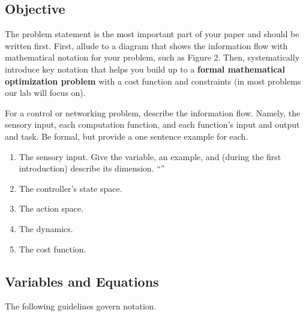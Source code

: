 \subsection{Objective}
The problem statement is the most important part of your paper and should be written first. First, allude to a diagram that shows the information flow with mathematical notation for your problem, such as Figure 2.
Then, systematically introduce key notation that helps you build up to a \textbf{formal mathematical optimization problem} with a cost function and constraints (in most problems our lab will focus on).

For a control or networking problem, describe the information flow. 
Namely, the sensory input, each computation function, and each function's input and output and task. Be formal, but provide a one sentence example for each.

\begin{enumerate}
    \item The sensory input.  Give the variable, an example,  and (during the first introduction) describe its dimension. ``''
    \item The controller's state space.
    \item The action space.
    \item The dynamics.
    \item The cost function.
\end{enumerate}

\subsection{Variables and Equations}

The following guidelines govern notation.

